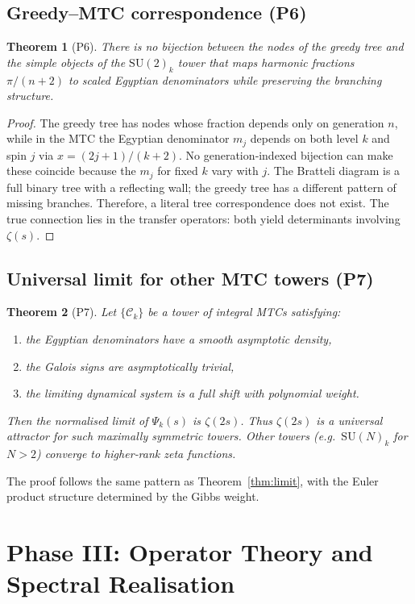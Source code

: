 \documentclass[11pt,a4paper]{article}
\newtheorem{theorem}{Theorem}[section]
\theoremstyle{remark}
\newcommand{\cC}{\mathcal{C}}
\begin{document}
\subsection{Greedy–MTC correspondence (P6)}
\begin{theorem}[P6]
There is no bijection between the nodes of the greedy tree and the simple objects of the $\mathrm{SU}(2)_k$ tower that maps harmonic fractions $\pi/(n+2)$ to scaled Egyptian denominators while preserving the branching structure.
\end{theorem}
\begin{proof}
The greedy tree has nodes whose fraction depends only on generation $n$, while in the MTC the Egyptian denominator $m_j$ depends on both level $k$ and spin $j$ via $x=(2j+1)/(k+2)$. No generation‑indexed bijection can make these coincide because the $m_j$ for fixed $k$ vary with $j$. The Bratteli diagram is a full binary tree with a reflecting wall; the greedy tree has a different pattern of missing branches. Therefore, a literal tree correspondence does not exist. The true connection lies in the transfer operators: both yield determinants involving $\zeta(s)$.
\end{proof}

\subsection{Universal limit for other MTC towers (P7)}
\begin{theorem}[P7]
Let $\{\cC_k\}$ be a tower of integral MTCs satisfying:
\begin{enumerate}
\item the Egyptian denominators have a smooth asymptotic density,
\item the Galois signs are asymptotically trivial,
\item the limiting dynamical system is a full shift with polynomial weight.
\end{enumerate}
Then the normalised limit of $\Psi_k(s)$ is $\zeta(2s)$. Thus $\zeta(2s)$ is a universal attractor for such maximally symmetric towers. Other towers (e.g.\ $\mathrm{SU}(N)_k$ for $N>2$) converge to higher‑rank zeta functions.
\end{theorem}
The proof follows the same pattern as Theorem~\ref{thm:limit}, with the Euler product structure determined by the Gibbs weight.

\section{Phase III: Operator Theory and Spectral Realisation}
\end{document}
